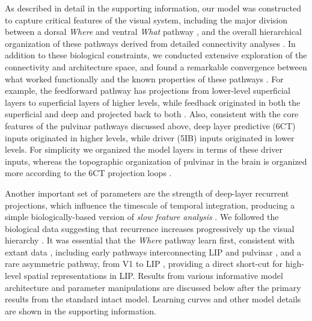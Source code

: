 \documentclass[11pt,twoside]{article}
\newif\myifpdf
\begin{document}
As described in detail in the supporting information, our model was constructed to capture critical features of the visual system, including the major division between a dorsal \emph{Where} and ventral \emph{What} pathway \citep{UngerleiderMishkin82}, and the overall hierarchical organization of these pathways derived from detailed connectivity analyses \citep{RocklandPandya79,FellemanVanEssen91,MarkovVezoliChameauEtAl14,MarkovErcsey-RavaszGomesEtAl14}.  In addition to these biological constraints, we conducted extensive exploration of the connectivity and architecture space, and found a remarkable convergence between what worked functionally and the known properties of these pathways \citep{OReillyWyatteRohrlich17}.  For example, the feedforward pathway has projections from lower-level superficial layers to superficial layers of higher levels, while feedback originated in both the superficial and deep and projected back to both \citep{RocklandPandya79,FellemanVanEssen91}.  Also, consistent with the core features of the pulvinar pathways discussed above, deep layer predictive (6CT) inputs originated in higher levels, while driver (5IB) inputs originated in lower levels.  For simplicity we organized the model layers in terms of these driver inputs, whereas the topographic organization of pulvinar in the brain is organized more according to the 6CT projection loops \citep{Shipp03}.

Another important set of parameters are the strength of deep-layer recurrent projections, which influence the timescale of temporal integration, producing a simple biologically-based version of \emph{slow feature analysis} \citep{WiskottSejnowski02,Foldiak91}. We followed the biological data suggesting that recurrence increases progressively up the visual hierarchy \citep{ChaudhuriKnoblauchGarielEtAl15}.  It was essential that the \emph{Where} pathway learn first, consistent with extant data \citep{BourneRosa06,KiorpesPriceHall-HaroEtAl12}, including early pathways interconnecting LIP and pulvinar \citep{BridgeLeopoldBourne16}, and a rare asymmetric pathway, from V1 to LIP \citep{MarkovErcsey-RavaszGomesEtAl14}, providing a direct short-cut for high-level spatial representations in LIP.  Results from various informative model architecture and parameter manipulations are discussed below after the primary results from the standard intact model.  Learning curves and other model details are shown in the supporting information.
\end{document}
